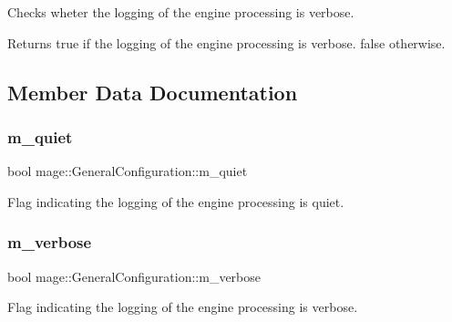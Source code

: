 Checks wheter the logging of the engine processing is verbose.

\begin{DoxyReturn}{Returns}
{\ttfamily true} if the logging of the engine processing is verbose. {\ttfamily false} otherwise. 
\end{DoxyReturn}


\subsection{Member Data Documentation}
\hypertarget{structmage_1_1_general_configuration_aaa638cb4be1dfc8d3af3fddfb7933773}{}\label{structmage_1_1_general_configuration_aaa638cb4be1dfc8d3af3fddfb7933773} 
\subsubsection{\texorpdfstring{m\+\_\+quiet}{m\_quiet}}
{\footnotesize\ttfamily bool mage\+::\+General\+Configuration\+::m\+\_\+quiet}

Flag indicating the logging of the engine processing is quiet. \hypertarget{structmage_1_1_general_configuration_aacc88850ee46834ab0ee52bbfa8a3a80}{}\label{structmage_1_1_general_configuration_aacc88850ee46834ab0ee52bbfa8a3a80} 
\subsubsection{\texorpdfstring{m\+\_\+verbose}{m\_verbose}}
{\footnotesize\ttfamily bool mage\+::\+General\+Configuration\+::m\+\_\+verbose}

Flag indicating the logging of the engine processing is verbose. 